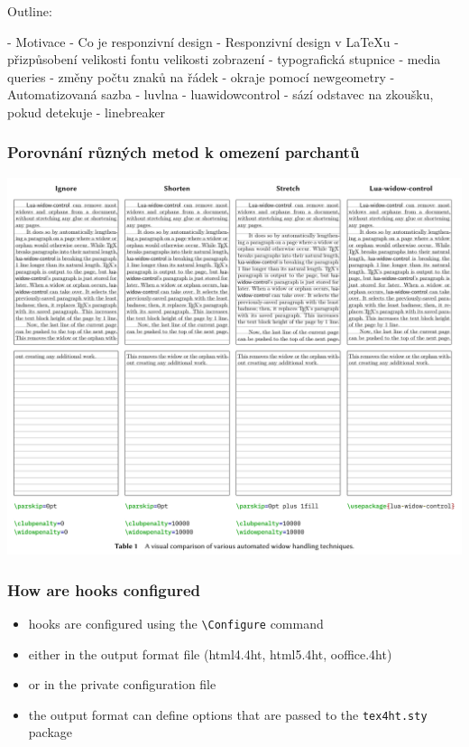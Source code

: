 
Outline:

- Motivace
- Co je responzivní design
- Responzivní design v LaTeXu
  - přizpůsobení velikosti fontu velikosti zobrazení
  - typografická stupnice
  - media queries
    - změny počtu znaků na řádek
    - okraje pomocí newgeometry
- Automatizovaná sazba
  - luvlna
  - luawidowcontrol
    - sází odstavec na zkoušku, pokud detekuje 
  - linebreaker

 
\begin{frame}
  \frametitle{Porovnání různých metod k omezení parchantů}
  \begin{center}
  \includegraphics[height=.95\textheight]{img/lua-widow.pdf}
  \end{center}
\end{frame}



\begin{frame}
  \frametitle{How are hooks configured}
  \begin{itemize}
    \item hooks are configured using the \texttt{\textbackslash Configure} command
    \item either in the output format file (html4.4ht, html5.4ht, ooffice.4ht)
    \item or in the private configuration file
    \item the output format can define options that are passed to the \texttt{tex4ht.sty} package

\end{itemize}
\end{frame}

